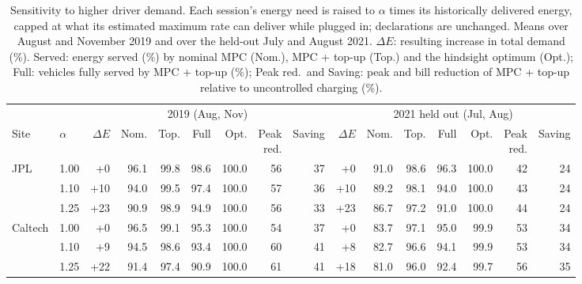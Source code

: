 \begin{table}[H]
\centering
\caption{Sensitivity to higher driver demand. Each session's energy need is raised to $\alpha$ times its historically delivered energy, capped at what its estimated maximum rate can deliver while plugged in; declarations are unchanged. Means over August and November 2019 and over the held-out July and August 2021. $\Delta E$: resulting increase in total demand (\%). Served: energy served (\%) by nominal MPC (Nom.), MPC + top-up (Top.) and the hindsight optimum (Opt.); Full: vehicles fully served by MPC + top-up (\%); Peak red.\ and Saving: peak and bill reduction of MPC + top-up relative to uncontrolled charging (\%).}
\label{tab:demandscale}
\scriptsize
\setlength{\tabcolsep}{1.5pt}
\begin{tabular*}{\textwidth}{@{\extracolsep{\fill}}llrrrrrrrrrrrrrr@{}}
\hline
 & & \multicolumn{7}{c}{2019 (Aug, Nov)} & \multicolumn{7}{c}{2021 held out (Jul, Aug)} \\
Site & $\alpha$ & $\Delta E$ & Nom. & Top. & Full & Opt. & \makecell[r]{Peak\\red.} & Saving & $\Delta E$ & Nom. & Top. & Full & Opt. & \makecell[r]{Peak\\red.} & Saving \\
\hline
JPL & 1.00 & +0 & 96.1 & 99.8 & 98.6 & 100.0 & 56 & 37 & +0 & 91.0 & 98.6 & 96.3 & 100.0 & 42 & 24 \\
 & 1.10 & +10 & 94.0 & 99.5 & 97.4 & 100.0 & 57 & 36 & +10 & 89.2 & 98.1 & 94.0 & 100.0 & 43 & 24 \\
 & 1.25 & +23 & 90.9 & 98.9 & 94.9 & 100.0 & 56 & 33 & +23 & 86.7 & 97.2 & 91.0 & 100.0 & 44 & 24 \\
\hline
Caltech & 1.00 & +0 & 96.5 & 99.1 & 95.3 & 100.0 & 54 & 37 & +0 & 83.7 & 97.1 & 95.0 & 99.9 & 53 & 34 \\
 & 1.10 & +9 & 94.5 & 98.6 & 93.4 & 100.0 & 60 & 41 & +8 & 82.7 & 96.6 & 94.1 & 99.9 & 53 & 34 \\
 & 1.25 & +22 & 91.4 & 97.4 & 90.9 & 100.0 & 61 & 41 & +18 & 81.0 & 96.0 & 92.4 & 99.7 & 56 & 35 \\
\hline
\end{tabular*}
\end{table}
